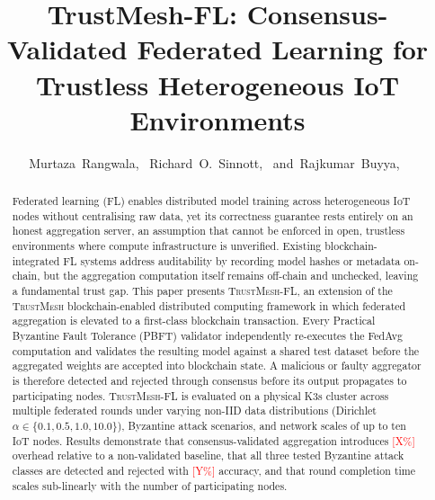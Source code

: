 \documentclass[lettersize,journal]{IEEEtran}
\newcommand{\tmfl}{\textsc{TrustMesh-FL}}
\newcommand{\tm}{\textsc{TrustMesh}}
\begin{document}
\title{TrustMesh-FL: Consensus-Validated Federated Learning for Trustless Heterogeneous IoT Environments}

\author{Murtaza~Rangwala,~
        Richard~O.~Sinnott,~\IEEEmembership{}
        and~Rajkumar~Buyya,~
\\
}

\maketitle

\begin{abstract}
Federated learning (FL) enables distributed model training across heterogeneous IoT nodes without centralising raw data, yet its correctness guarantee rests entirely on an honest aggregation server, an assumption that cannot be enforced in open, trustless environments where compute infrastructure is unverified. Existing blockchain-integrated FL systems address auditability by recording model hashes or metadata on-chain, but the aggregation computation itself remains off-chain and unchecked, leaving a fundamental trust gap. This paper presents \tmfl{}, an extension of the \tm{} blockchain-enabled distributed computing framework in which federated aggregation is elevated to a first-class blockchain transaction. Every Practical Byzantine Fault Tolerance (PBFT) validator independently re-executes the FedAvg computation and validates the resulting model against a shared test dataset before the aggregated weights are accepted into blockchain state. A malicious or faulty aggregator is therefore detected and rejected through consensus before its output propagates to participating nodes. \tmfl{} is evaluated on a physical K3s cluster across multiple federated rounds under varying non-IID data distributions (Dirichlet $\alpha \in \{0.1, 0.5, 1.0, 10.0\}$), Byzantine attack scenarios, and network scales of up to ten IoT nodes. Results demonstrate that consensus-validated aggregation introduces \textcolor{red}{[X\%]} overhead relative to a non-validated baseline, that all three tested Byzantine attack classes are detected and rejected with \textcolor{red}{[Y\%]} accuracy, and that round completion time scales sub-linearly with the number of participating nodes.
\end{abstract}
\end{document}
